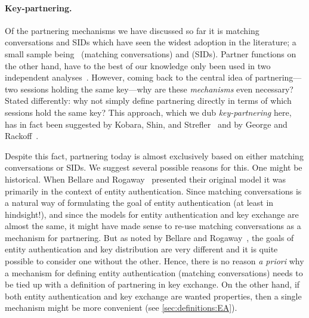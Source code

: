 \paragraph{Key-partnering.}
Of the partnering mechanisms we have discussed so far
it is matching conversations and SIDs which have seen the widest adoption in the literature;
a small sample being~\cite{C:BelRog93,Blake-WilsonM:1997:BR93_asymmetric,C:Krawczyk05,PKC:LauMit06,ASIACCS:MenUst08,ESORICS:CreFel12,C:JKSS12,CCS:BDKSS14,Cohn-GordonCG:2016:post-compromise} (matching conversations)
and \cite{EC:BelPoiRog00,EC:CanKra01,C:CanKra02,ACNS:JeoKatLee04,PKC:AbdFouPoi05,RogawayS:2009:elision,CCS:BFWW11,BrzuskaFSWW:2012:less_is_more,CCS:BSWW13,C:KraPatWee13,CCS:FisGue14,CCS:DFGS15} (SIDs).
Partner functions on the other hand,
have to the best of our knowledge only been used in two independent analyses~\cite{STOC:BelRog95,EC:ShoRub96}.
However,
coming back to the central idea of partnering---two sessions holding the same key---why are these \emph{mechanisms} even necessary?
Stated differently:
why not simply define partnering directly in terms of which sessions hold the same key?
This approach,
which we dub \emph{key-partnering} here,
has in fact been suggested by  Kobara, Shin, and Strefler~\cite{ASIACCS:KobShiStr09} and by George and Rackoff~\cite{EPRINT:GeoRac13}.

Despite this fact,
partnering today is almost exclusively based on either matching conversations or SIDs.  
We suggest several possible reasons for this.
One might be historical.
When Bellare and Rogaway~\cite{C:BelRog93} presented their original model it was primarily in the context of entity authentication.
Since matching conversations is a natural way of formulating the goal of entity authentication 
(at least in hindsight!),
and since the models for entity authentication and key exchange are almost the same,
it might have made sense to re-use matching conversations as a mechanism for partnering.
But as noted by Bellare and Rogaway~\cite{STOC:BelRog95},
the goals of entity authentication and key distribution are very different and it is quite possible to consider one without the other.
Hence,
there is no reason \emph{a priori} why a mechanism for defining entity authentication 
(matching conversations) needs to be tied up with a definition of partnering in key exchange.
On the other hand,
if both entity authentication and key exchange are wanted properties,
then a single mechanism might be more convenient
(see \cref{sec:definitions:EA}).


